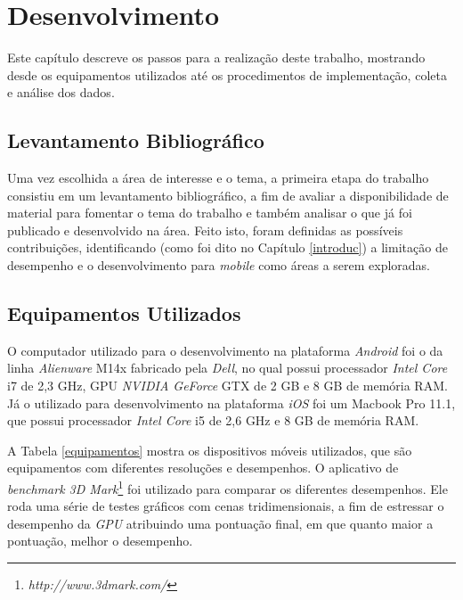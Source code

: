 \chapter[Desenvolvimento]{Desenvolvimento}

	Este capítulo descreve os passos para a realização deste trabalho, mostrando desde os equipamentos utilizados até os procedimentos de implementação, coleta e análise dos dados. 

\section{Levantamento Bibliográfico}

Uma vez escolhida a área de interesse e o tema, a primeira etapa do trabalho consistiu em um levantamento bibliográfico, a fim de avaliar a disponibilidade de material para fomentar o tema do trabalho e também analisar o que já foi publicado e desenvolvido na área. Feito isto, foram definidas as possíveis contribuições, identificando (como foi dito no Capítulo \ref{introduc}) a limitação de desempenho e o desenvolvimento para \textit{mobile} como áreas a serem exploradas.  

\section{Equipamentos Utilizados}
\label{equip}

	 O computador utilizado para o desenvolvimento na plataforma \textit{Android} foi o da linha \textit{Alienware} M14x fabricado pela \textit{Dell}, no qual possui processador \textit{Intel Core} i7 de 2,3 GHz, GPU \textit{NVIDIA GeForce} GTX de 2 GB e 8 GB de memória RAM.  Já o utilizado para desenvolvimento na plataforma \textit{iOS} foi um Macbook Pro 11.1, que possui processador \textit{Intel Core} i5 de 2,6 GHz e 8 GB de memória RAM.

	A Tabela \ref{equipamentos} mostra os dispositivos móveis utilizados, que são equipamentos com diferentes resoluções e desempenhos. O aplicativo de \textit{benchmark 3D Mark}\footnote{\textit{http://www.3dmark.com/}} foi utilizado para comparar os diferentes desempenhos. Ele roda uma série de testes gráficos com cenas tridimensionais, a fim de estressar o desempenho da \textit{GPU} atribuindo uma pontuação final, em que quanto maior a pontuação, melhor o desempenho.
	
